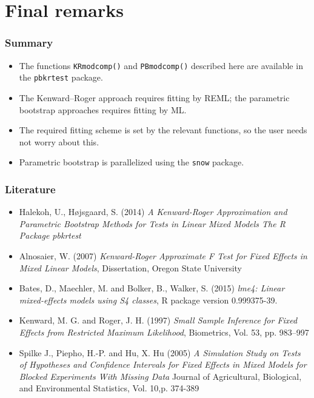 \documentclass[compress]{beamer}\usepackage[]{graphicx}\usepackage[]{color}
\newenvironment{sframe}
{\begin{frame} [containsverbatim] }
  {\end{frame}}
\begin{document}
\section{Final remarks}
\label{sec:final-remarks}

\begin{sframe}
  \frametitle{Summary}

  \begin{itemize}
  \item   The functions \verb'KRmodcomp()' and \verb'PBmodcomp()' 
    described here are available in the \verb+pbkrtest+ package.

    
  \item The Kenward--Roger approach requires fitting by REML; the parametric
  bootstrap approaches requires fitting by ML.


\item The required fitting scheme is set by the relevant functions, so the
  user needs not worry about this.


\item Parametric bootstrap is parallelized using the \verb'snow'
  package. 
  
  \end{itemize}
  

\end{sframe}


\begin{sframe}
  \frametitle{Literature}

\begin{itemize}
\item Halekoh, U., H{\o}jsgaard, S. (2014)
\textit{ 	A Kenward-Roger Approximation and Parametric Bootstrap Methods for Tests in Linear Mixed Models The R Package pbkrtest}
\item
Alnosaier, W. (2007) 
\textit{Kenward-Roger Approximate F Test for Fixed Effects in Mixed Linear Models}, Dissertation, Oregon State University  
\item
Bates, D., Maechler, M.  and Bolker, B., Walker, S. (2015)
\textit{lme4: Linear mixed-effects models using S4 classes},
R package version 0.999375-39.
\item
Kenward,  M. G. and Roger, J. H. (1997)
\textit{Small Sample Inference for Fixed Effects from Restricted Maximum Likelihood},
Biometrics, Vol. 53, pp. 983--997                    
\item
Spilke J., Piepho, H.-P. and Hu, X. Hu (2005)
\textit{A Simulation Study on Tests of Hypotheses
and Confidence Intervals for Fixed Effects in
Mixed Models for Blocked Experiments With
Missing Data}
Journal of Agricultural, Biological, and Environmental Statistics,
Vol. 10,p. 374-389
\end{itemize}
\end{sframe}
\end{document}
